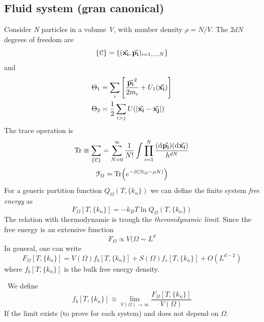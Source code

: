\documentclass[../main/main.tex]{subfiles}
\begin{document}
\subsection{Fluid system (gran canonical)}
Consider \emph{N} particles in a volume \emph{V}, with number density \( \rho =N/V \).
The \( 2dN \)  degrees of freedom are
\begin{equation}
  \{ \mathcal{C} \} =  \{ (\va{x_i}, \va{p_i}  )_{i=1,\dots,N} \}
\end{equation}
and
\begin{subequations}
\begin{align}
  \Theta _1 &= \sum_{i}^{} \qty[\frac{\va{ p_i}^2}{2 m_i} + U_1 (\va{x_i} )]    \\
  \Theta _2 &= \frac{1}{2} \sum_{i>j}^{} U (\abs{\va{x_i}-\va{x_j}  } )
\end{align}
\end{subequations}
The trace operation is
\begin{equation}
  \Tr \equiv \sum_{\{ \mathcal{C} \}  }^{} = \sum_{N=0}^{\infty } \frac{1}{N!} \int_{}^{} \prod_{i=1}^{N} \frac{ (\dd[]{\va{p_i} }  ) (\dd[]{\va{x_i} } )}{h^{dN}}
\end{equation}
\begin{equation}
  \mathcal{F}_ \Omega = \Tr(e^{-\beta (\mathcal{H}_ \Omega - \mu N) } )
\end{equation}
For a generic partition function \( Q_ \Omega (T, \{ k_n \}  ) \) we can define the finite system \emph{free energy} as
\begin{equation}
  F_ \Omega [T,\{ k_n \}  ] = - k_B T \ln{Q_ \Omega (T, \{ k_n \}  )}
\end{equation}
The relation with thermodynamic is trough the \emph{theromdynamic limit}. Since the free energy is an extensive function
\begin{equation}
  F_ \Omega \propto V (\Omega  \sim L^d
\end{equation}
In general, one can write
\begin{equation}
  F_ \Omega [T,\{ k_n \}  ] = V (\Omega ) f_b [T,\{ k_n \}  ] + S (\Omega ) f_s [T,\{ k_n \}  ] + O (L^{d-2})
\end{equation}
where \( f_b [T,\{ k_n \}  ] \) is the bulk free energy density.
\begin{definition} [] \
We define
\begin{equation}
  f_b [T,\{ k_n \}  ] \equiv \lim_{V (\Omega ) \rightarrow \infty } \frac{F_ \Omega [T,\{ k_n \}  ]}{V (\Omega )}
\end{equation}
If the limit exists (to prove for each system) and does not depend on \( \Omega  \).
\end{definition}
\end{document}
